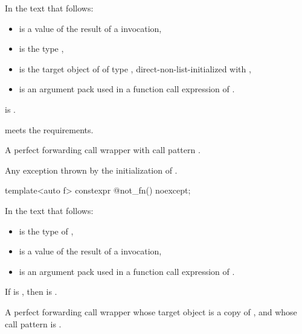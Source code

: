 \begin{itemdescr}
\pnum
In the text that follows:
\begin{itemize}
\item {} is a value of the result of a  invocation,
\item {} is the type ,
\item {} is the target object of 
  of type ,
  direct-non-list-initialized with ,
\item {} is an argument pack
  used in a function call expression of .
\end{itemize}

\pnum
\mandates
{}
is .

\pnum
\expects
{} meets the  requirements.

\pnum
\returns
A perfect forwarding call wrapper 
with call pattern .

\pnum
\throws
Any exception thrown by the initialization of .
\end{itemdescr}

%
\begin{itemdecl}
template<auto f> constexpr @\unspec@ not_fn() noexcept;
\end{itemdecl}

\begin{itemdescr}
\pnum
In the text that follows:
\begin{itemize}
\item
{} is the type of ,
\item
{} is a value of the result of a  invocation,
\item
{} is an argument pack
used in a function call expression of .
\end{itemize}

\pnum
\mandates
If  is ,
then  is .

\pnum
\returns
A perfect forwarding call wrapper 
whose target object is a copy of , and
whose call pattern is .
\end{itemdescr}

